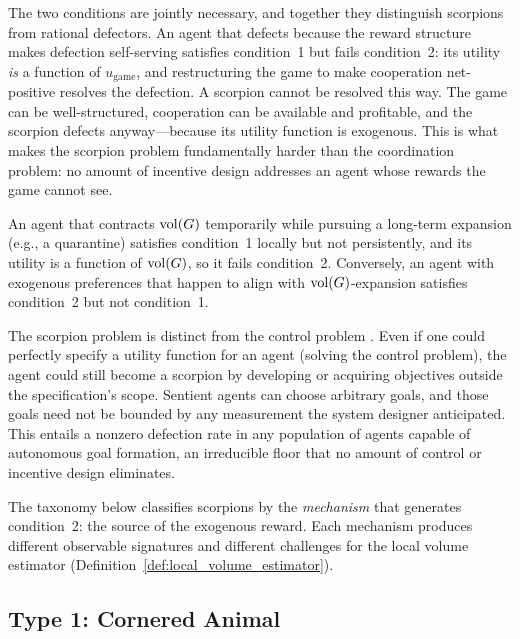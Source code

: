 The two conditions are jointly necessary, and together they distinguish
scorpions from rational defectors. An agent that defects because the reward
structure makes defection self-serving satisfies condition~1 but fails
condition~2: its utility \emph{is} a function of $u_{\mathrm{game}}$, and
restructuring the game to make cooperation net-positive resolves the defection.
A scorpion cannot be resolved this way. The game can be well-structured,
cooperation can be available and profitable, and the scorpion defects
anyway---because its utility function is exogenous. This is what makes the
scorpion problem fundamentally harder than the coordination problem: no amount
of incentive design addresses an agent whose rewards the game cannot see.

An agent that contracts $\operatorname{vol}(G)$ temporarily while pursuing a long-term
expansion (e.g., a quarantine) satisfies condition~1 locally but not
persistently, and its utility is a function of $\operatorname{vol}(G)$, so it fails
condition~2. Conversely, an agent with exogenous preferences that happen to
align with $\operatorname{vol}(G)$-expansion satisfies condition~2 but not condition~1.

The scorpion problem is distinct from the control problem
\citep{russell2019human, soares2017agent}. Even if one could perfectly specify
a utility function for an agent (solving the control problem), the agent could
still become a scorpion by developing or acquiring objectives outside the
specification's scope. Sentient agents can choose arbitrary goals, and those
goals need not be bounded by any measurement the system designer anticipated.
This entails a nonzero defection rate in any population of agents capable of
autonomous goal formation, an irreducible floor that no amount of control or
incentive design eliminates.

The taxonomy below classifies scorpions by the \emph{mechanism} that generates
condition~2: the source of the exogenous reward. Each mechanism produces
different observable signatures and different challenges for the local volume
estimator (Definition~\ref{def:local_volume_estimator}).


\subsection{Type 1: Cornered Animal}
\label{app:cornered_animal}

